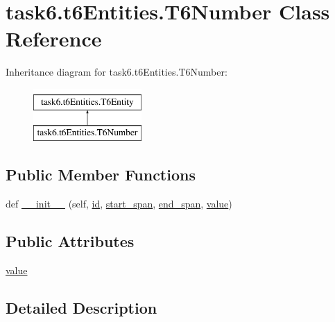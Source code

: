 \hypertarget{classtask6_1_1t6Entities_1_1T6Number}{}\section{task6.\+t6\+Entities.\+T6\+Number Class Reference}
\label{classtask6_1_1t6Entities_1_1T6Number}
Inheritance diagram for task6.\+t6\+Entities.\+T6\+Number\+:\begin{figure}[H]
\begin{center}
\leavevmode
\includegraphics[height=2.000000cm]{classtask6_1_1t6Entities_1_1T6Number}
\end{center}
\end{figure}
\subsection*{Public Member Functions}
\begin{DoxyCompactItemize}
\item 
def \hyperlink{classtask6_1_1t6Entities_1_1T6Number_a1b851deb36620e06ae15585568f49cc3}{\+\_\+\+\_\+init\+\_\+\+\_\+} (self, \hyperlink{classtask6_1_1t6Entities_1_1T6Entity_afeeced8134bb3ebe0cfecc64d0ab46a4}{id}, \hyperlink{classtask6_1_1t6Entities_1_1T6Entity_a52779e9af8864dc98e8b02fc5b9b041a}{start\+\_\+span}, \hyperlink{classtask6_1_1t6Entities_1_1T6Entity_aeb402200b156cd9562c5111dfe777b98}{end\+\_\+span}, \hyperlink{classtask6_1_1t6Entities_1_1T6Number_a0a09fb41791cdfb13680185e7d996d8c}{value})
\end{DoxyCompactItemize}
\subsection*{Public Attributes}
\begin{DoxyCompactItemize}
\item 
\hyperlink{classtask6_1_1t6Entities_1_1T6Number_a0a09fb41791cdfb13680185e7d996d8c}{value}
\end{DoxyCompactItemize}


\subsection{Detailed Description}


